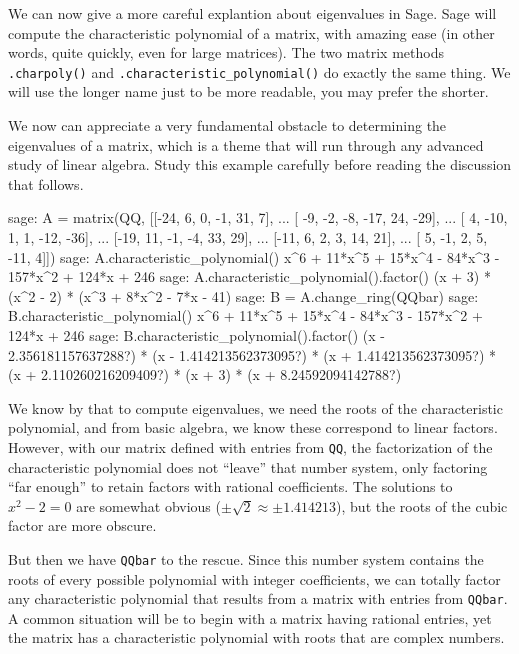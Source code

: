 We can now give a more careful explantion about eigenvalues in Sage.  Sage will compute the characteristic polynomial of a matrix, with amazing ease (in other words, quite quickly, even for large matrices).  The two matrix methods \verb!.charpoly()! and \verb!.characteristic_polynomial()! do exactly the same thing.  We will use the longer name just to be more readable, you may prefer the shorter.\par
%
We now can appreciate a very fundamental obstacle to determining the eigenvalues of a matrix, which is a theme that will run through any advanced study of linear algebra.  Study this example carefully before reading the discussion that follows.
%
\begin{sageexample}
sage: A = matrix(QQ, [[-24,   6,  0,  -1,  31,   7],
...                   [ -9,  -2, -8, -17,  24, -29],
...                   [  4, -10,  1,   1, -12, -36],
...                   [-19,  11, -1,  -4,  33,  29],
...                   [-11,   6,  2,   3,  14,  21],
...                   [  5,  -1,  2,   5, -11,   4]])
sage: A.characteristic_polynomial()
x^6 + 11*x^5 + 15*x^4 - 84*x^3 - 157*x^2 + 124*x + 246
sage: A.characteristic_polynomial().factor()
(x + 3) * (x^2 - 2) * (x^3 + 8*x^2 - 7*x - 41)
sage: B = A.change_ring(QQbar)
sage: B.characteristic_polynomial()
x^6 + 11*x^5 + 15*x^4 - 84*x^3 - 157*x^2 + 124*x + 246
sage: B.characteristic_polynomial().factor()
(x - 2.356181157637288?) * (x - 1.414213562373095?) *
(x + 1.414213562373095?) * (x + 2.110260216209409?) *
(x + 3) * (x + 8.24592094142788?)
\end{sageexample}
%
We know by  that to compute eigenvalues, we need the roots of the characteristic polynomial, and from basic algebra, we know these correspond to linear factors.  However, with our matrix defined with entries from \verb!QQ!, the factorization of the characteristic polynomial does not ``leave'' that number system, only factoring ``far enough'' to retain factors with rational coefficients.  The solutions to $x^2 - 2 = 0$ are somewhat obvious ($\pm\sqrt{2}\approx\pm 1.414213$), but the roots of the cubic factor are more obscure.\par
%
But then we have \verb!QQbar! to the rescue.  Since this number system contains the roots of every possible polynomial with integer coefficients, we can totally factor any characteristic polynomial that results from a matrix with entries from \verb!QQbar!.  A common situation will be to begin with a matrix having rational entries, yet the matrix has a characteristic polynomial with roots that are complex numbers.\par

